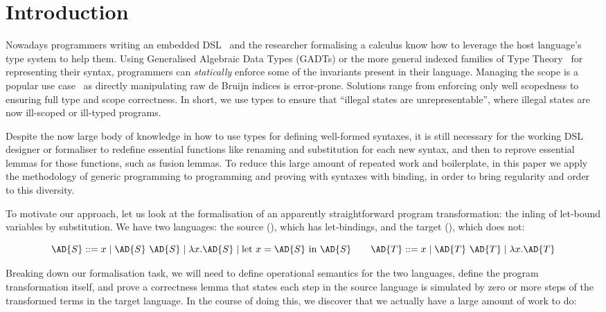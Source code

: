 
\section{Introduction}

Nowadays programmers writing an embedded DSL~\cite{hudak1996building}
and the researcher formalising a calculus know how to leverage the
host language's type system to help them. Using Generalised Algebraic
Data Types (GADTs) or the more general indexed families of Type
Theory~\cite{dybjer1994inductive} for representing their syntax,
programmers can \emph{statically} enforce some of the invariants
present in their language. Managing the scope is a popular use
case~\cite{altenkirch1999monadic} as directly manipulating raw de
Bruijn indices is error-prone.  Solutions range from enforcing only
well scopedness to ensuring full type and scope correctness. In short,
we use types to ensure that ``illegal states are unrepresentable'',
where illegal states are now ill-scoped or ill-typed programs.

Despite the now large body of knowledge in how to use types for
defining well-formed syntaxes, it is still necessary for the working
DSL designer or formaliser to redefine essential functions like
renaming and substitution for each new syntax, and then to reprove
essential lemmas for those functions, such as fusion lemmas. To reduce
this large amount of repeated work and boilerplate, in this paper we
apply the methodology of generic programming to programming and
proving with syntaxes with binding, in order to bring regularity and
order to this diversity.

To motivate our approach, let us look at the formalisation of an
apparently straightforward program transformation: the inling of
let-bound variables by substitution. We have two languages: the source
(), which has let-bindings, and the target (), which does
not:

\begin{displaymath}
  \AD{S} ::= x \mid \AD{S}~\AD{S} \mid \lambda x. \AD{S} \mid \textrm{let }x=\AD{S}\textrm{ in }\AD{S}
  \qquad
  \AD{T} ::= x \mid \AD{T}~\AD{T} \mid \lambda x. \AD{T}
\end{displaymath}

Breaking down our formalisation task, we will need to define
operational semantics for the two languages, define the program
transformation itself, and prove a correctness lemma that states each
step in the source language is simulated by zero or more steps of the
transformed terms in the target language. In the course of doing this,
we discover that we actually have a large amount of work to do:

